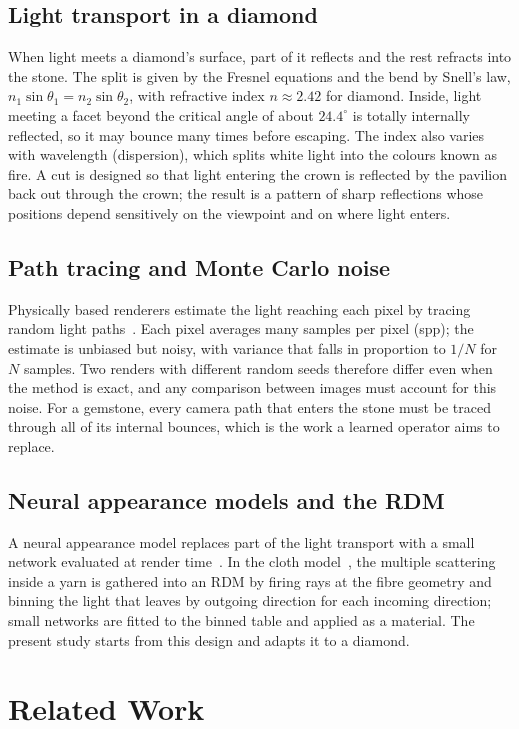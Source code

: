 \documentclass[conference]{IEEEtran}
\newcommand{\dg}{^{\circ}}
\begin{document}
\subsection{Light transport in a diamond}
When light meets a diamond's surface, part of it reflects and the rest
refracts into the stone. The split is given by the Fresnel equations and the
bend by Snell's law, $n_1\sin\theta_1=n_2\sin\theta_2$, with refractive index
$n\approx2.42$ for diamond. Inside, light meeting a facet beyond the critical
angle of about $24.4\dg$ is totally internally reflected, so it may bounce many
times before escaping. The index also varies with wavelength (dispersion),
which splits white light into the colours known as fire. A cut is designed so
that light entering the crown is reflected by the pavilion back out through the
crown; the result is a pattern of sharp reflections whose positions depend
sensitively on the viewpoint and on where light enters.

\subsection{Path tracing and Monte Carlo noise}
Physically based renderers estimate the light reaching each pixel by tracing
random light paths~\cite{kajiya1986,pharr2023}. Each pixel averages many
samples per pixel (spp); the estimate is unbiased but noisy, with variance that
falls in proportion to $1/N$ for $N$ samples. Two renders with different random
seeds therefore differ even when the method is exact, and any comparison
between images must account for this noise. For a gemstone, every camera path
that enters the stone must be traced through all of its internal bounces,
which is the work a learned operator aims to replace.

\subsection{Neural appearance models and the RDM}
A neural appearance model replaces part of the light transport with a small
network evaluated at render time~\cite{zeltner2024,kuznetsov2021}. In the cloth
model~\cite{soh2024}, the multiple scattering inside a yarn is gathered into an
RDM by firing rays at the fibre geometry and binning the light that leaves by
outgoing direction for each incoming direction; small networks are fitted to the
binned table and applied as a material. The present study starts from this
design and adapts it to a diamond.

\section{Related Work}
\end{document}
